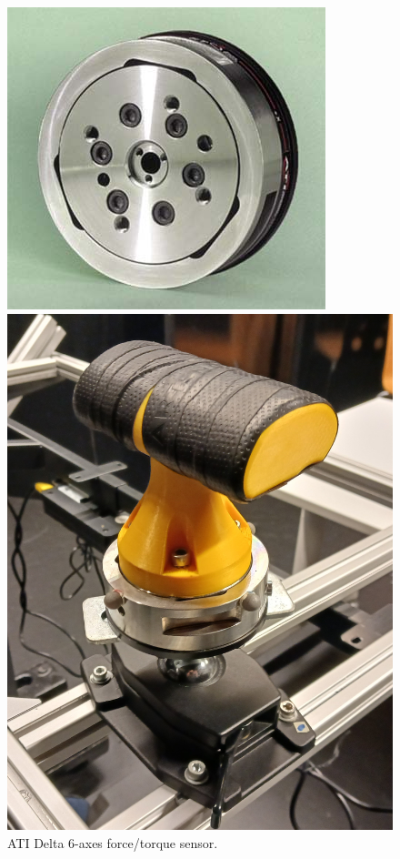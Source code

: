 \begin{figure}[!htb]
    \begin{minipage}{0.49\linewidth}
        \captionsetup{justification=centering}
        \centering
        \includegraphics[clip, width=0.6\linewidth]{img/chapter_5/ati_delta_force_torque.jpg}
        \caption{ATI Delta 6-axes force/torque sensor.}
        \label{fig:ati_delta_force_torque}
    \end{minipage}
    \hfill
    \begin{minipage}{0.49\linewidth}
        \centering
        \captionsetup{justification=centering}
        \begin{minipage}{0.49\linewidth}
            \centering
            \includegraphics[clip, width=0.92\linewidth]{img/chapter_5/handle_01.jpg}

\end{minipage}
\end{minipage}
\end{figure}
